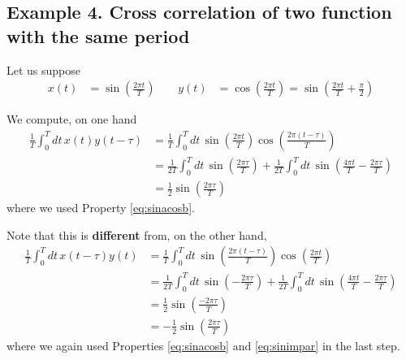 \documentclass{article}
\begin{document}
\subsection*{Example 4. Cross correlation of two function with the same period}
Let us suppose 
\begin{align}
  x(t) &= \sin\left( \frac{2\pi t}{T}\right)\,\quad & y(t) &= \cos \left( \frac{2\pi t}{T} \right) = \sin\left( \frac{2\pi t}{T} + \frac{\pi}{2}\right)
\end{align}

We compute, on one hand
\begin{align}
  \frac{1}{T} \int_0^T dt\, x(t) y(t-\tau) &=
  \frac{1}{T} \int_0^T dt\, \sin\left( \frac{2\pi t}{T}\right) \cos\left( \frac{2\pi (t-\tau)}{T}\right) \\
  &= \frac{1}{2T} \int_0^T dt\, \sin \left( \frac{2 \pi \tau}{T} \right)
  +  \frac{1}{2T} \int_0^T dt\, \sin \left( \frac{4\pi t}{T} - \frac{2\pi \tau}{T}\right) \\
  &= \frac{1}{2} \sin\left(\frac{2\pi\tau}{T} \right)
\end{align}
where we used Property \ref{eq:sinacosb}.

Note that this is {\bf different} from, on the other hand, 
\begin{align}
  \frac{1}{T} \int_0^T dt\, x(t-\tau) y(t) &=
  \frac{1}{T} \int_0^T dt\, \sin\left( \frac{2\pi (t-\tau)}{T}\right) \cos\left( \frac{2\pi t}{T}\right) \\
  &= \frac{1}{2T} \int_0^T dt\, \sin \left( - \frac{2\pi \tau}{T}\right)
  +  \frac{1}{2T} \int_0^T dt\, \sin \left( \frac{4\pi t}{T} - \frac{2\pi \tau}{T}\right) \\
  &= \frac{1}{2} \sin\left(\frac{-2\pi\tau}{T} \right) \\
  &= -\frac{1}{2} \sin\left(\frac{2\pi\tau}{T} \right) 
\end{align}
where we again used Properties \ref{eq:sinacosb} and \ref{eq:sinimpar} in the last step.
\end{document}
